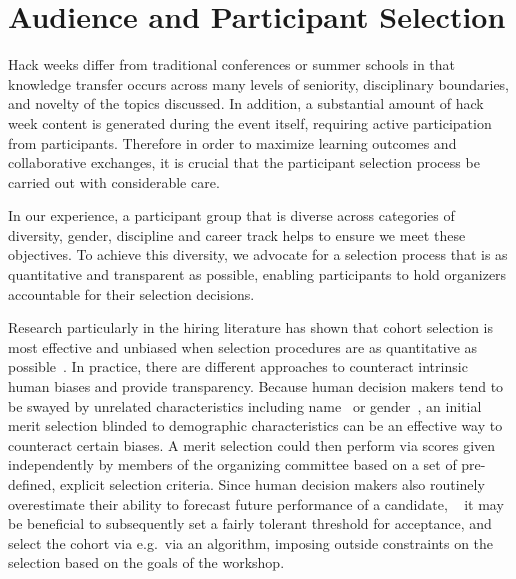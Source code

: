 \section*{Audience and Participant Selection}

Hack weeks differ from traditional conferences or summer schools in that knowledge transfer occurs across many levels of seniority, disciplinary boundaries, and novelty of the topics discussed.
In addition, a substantial amount of hack week content is generated during the event itself, requiring active participation from participants.
Therefore in order to maximize learning outcomes and collaborative exchanges, it is crucial that the participant selection process be carried out with considerable care.

In our experience, a participant group that is diverse across categories of diversity, gender, discipline and career track helps to ensure we meet these objectives.
To achieve this diversity, we advocate for a selection process that is as quantitative and transparent as possible, enabling participants to hold organizers accountable for their selection decisions.

Research particularly in the hiring literature has shown that cohort selection is most effective and unbiased when selection procedures are as quantitative as possible~\cite{sunstein2015wiser,bohnet2016}. 
In practice, there are different approaches to counteract intrinsic human biases and provide transparency. 
Because human decision makers tend to be swayed by unrelated characteristics including name~\cite{bertrand2004} or gender~\cite{mossracusin2012}, an initial merit selection blinded to demographic characteristics can be an effective way to counteract certain biases. A merit selection could then perform via scores given independently by members of the organizing committee based on a set of pre-defined, explicit selection criteria. 
Since human decision makers also routinely overestimate their ability to forecast future performance of a candidate, ~\cite{highhouse2008} it may be beneficial to subsequently set a fairly tolerant threshold for acceptance, and select the cohort via e.g.\ via an algorithm, imposing outside constraints on the selection based on the goals of the workshop. 

